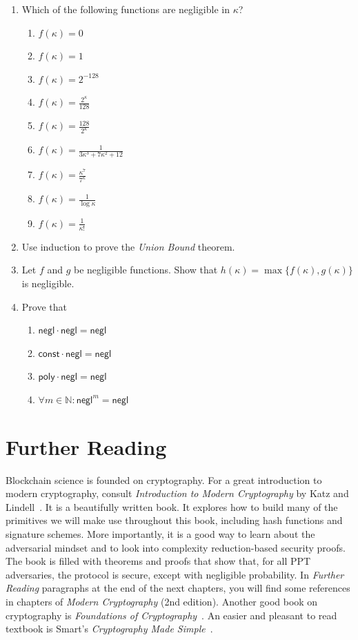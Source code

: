 \begin{enumerate}
  \item Which of the following functions are negligible in $\kappa$?
    \begin{enumerate}
      \item $f(\kappa) = 0$
      \item $f(\kappa) = 1$
      \item $f(\kappa) = 2^{-128}$
      \item $f(\kappa) = \frac{2^\kappa}{128}$
      \item $f(\kappa) = \frac{128}{2^\kappa}$
      \item $f(\kappa) = \frac{1}{3\kappa^3 + 7\kappa^2 + 12}$
      \item $f(\kappa) = \frac{\kappa^{7}}{7^{\kappa}}$
      \item $f(\kappa) = \frac{1}{\log \kappa}$
      \item $f(\kappa) = \frac{1}{\kappa!}$
    \end{enumerate}
  \item Use induction to prove the \emph{Union Bound} theorem.
  \item Let $f$ and $g$ be negligible functions. Show that $h(\kappa) = \max\{f(\kappa), g(\kappa)\}$
        is negligible.
  \item Prove that
    \begin{enumerate}
      \item $\textsf{negl} \cdot \textsf{negl} = \textsf{negl}$
      \item $\textsf{const} \cdot \textsf{negl} = \textsf{negl}$
      \item $\textsf{poly} \cdot \textsf{negl} = \textsf{negl}$
      \item $\forall m \in \mathbb{N}: \textsf{negl}^m = \textsf{negl}$
    \end{enumerate}
\end{enumerate}

\section*{Further Reading}

Blockchain science is founded on cryptography. For a great introduction to modern cryptography,
consult \emph{Introduction to Modern Cryptography} by Katz and Lindell~\cite{katz}. It is a beautifully
written book. It explores how to build many of the primitives we will make use throughout this book,
including hash functions and signature schemes. More importantly, it is a good way to learn about the
adversarial mindset and to look into complexity reduction-based security proofs. The book is filled with
theorems and proofs that show that, for all PPT adversaries, the protocol is secure, except with negligible
probability. In \emph{Further Reading} paragraphs at the end of the next chapters, you will find
some references in chapters of \emph{Modern Cryptography} (2nd edition).
Another good book on cryptography is \emph{Foundations of Cryptography}~\cite{foundations1,foundations2}.
An easier and pleasant to read textbook is Smart's \emph{Cryptography Made Simple}~\cite{smart}.

